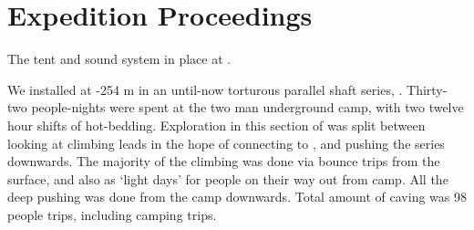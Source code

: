 \section{Expedition Proceedings}


    \begin{marginfigure}
\checkoddpage \ifoddpage \forcerectofloat \else \forceversofloat \fi
\centering
 \caption{The tent and sound system in place at \protect{}. }
 \label{metal camp tent}
\end{marginfigure}


We installed  at -254 m in an until-now torturous parallel shaft
series, . Thirty-two people-nights were spent at the two man underground camp,
with two twelve hour shifts of hot-bedding. Exploration in this section
of  was split between looking at
climbing leads in the hope of connecting to , and pushing the
 series downwards. The majority of the climbing
was done via bounce trips from the surface, and also as `light days' for
people on their way out from camp. All the deep pushing was done from
the camp downwards. Total amount of caving was 98 people trips,
including camping trips.

